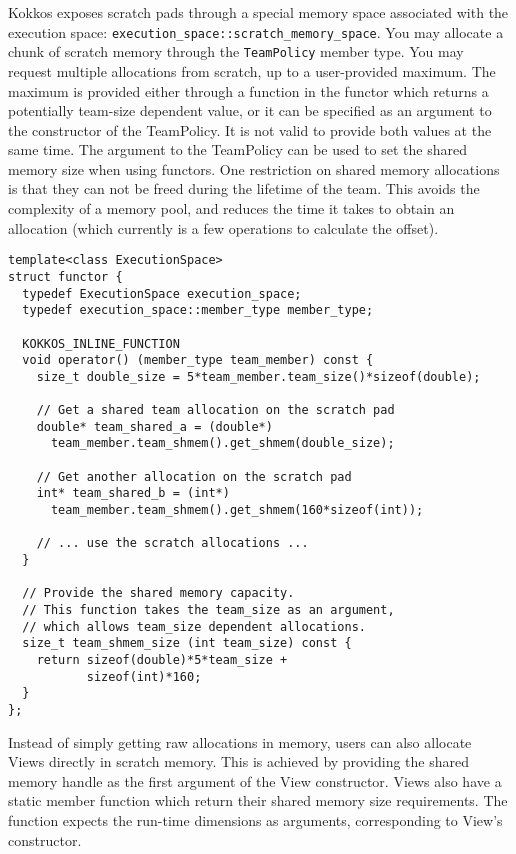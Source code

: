 Kokkos exposes scratch pads through a special memory space associated with the execution space:
\lstinline|execution_space::scratch_memory_space|.
You may allocate a chunk of scratch memory through the \lstinline|TeamPolicy| member type.
You may request multiple allocations from scratch, up to a user-provided maximum. 
The maximum is provided either through a function in the functor which returns a potentially team-size dependent value, 
or it can be specified as an argument to the constructor of the TeamPolicy. 
It is not valid to provide both values at the same time. 
The argument to the TeamPolicy can be used to set the shared memory size when using functors. 
One restriction on shared memory allocations is that they can not be freed during the lifetime of the team. 
This avoids the complexity of a memory pool,
and reduces the time it takes to obtain an allocation
(which currently is a few operations to calculate the offset). 

\begin{lstlisting}
template<class ExecutionSpace>
struct functor {
  typedef ExecutionSpace execution_space;
  typedef execution_space::member_type member_type; 

  KOKKOS_INLINE_FUNCTION
  void operator() (member_type team_member) const {
    size_t double_size = 5*team_member.team_size()*sizeof(double);

    // Get a shared team allocation on the scratch pad
    double* team_shared_a = (double*)
      team_member.team_shmem().get_shmem(double_size);

    // Get another allocation on the scratch pad
    int* team_shared_b = (int*)
      team_member.team_shmem().get_shmem(160*sizeof(int));

    // ... use the scratch allocations ...
  }

  // Provide the shared memory capacity.
  // This function takes the team_size as an argument,
  // which allows team_size dependent allocations.
  size_t team_shmem_size (int team_size) const {
    return sizeof(double)*5*team_size +
           sizeof(int)*160;
  }
};
\end{lstlisting}

Instead of simply getting raw allocations in memory, users can also allocate Views directly in scratch memory. 
This is achieved by providing the shared memory handle as the first argument of the View constructor.
Views also have a static member function which return their shared memory size requirements. 
The function expects the run-time dimensions as arguments, corresponding to View's constructor. 

